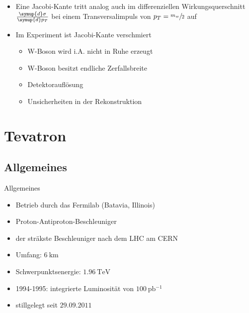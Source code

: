 \documentclass[aspectratio=1610, 9pt]{beamer}
\begin{document}
\begin{frame}
  \begin{itemize}
    \item Eine Jacobi-Kante tritt analog auch im differenziellen Wirkungsquerschnitt $\frac{\symup{d} \sigma}{\symup{d} p_T}$ bei einem Transversalimpuls von $p_T = \sfrac{m_w}{2}$ auf
    \item Im Experiment ist Jacobi-Kante verschmiert
    \begin{itemize}
      \item[\rightarrow] W-Boson wird i.A. nicht in Ruhe erzeugt
      \item[\rightarrow] W-Boson besitzt endliche Zerfallsbreite
      \item[\rightarrow] Detektorauflösung
      \item[\rightarrow] Unsicherheiten in der Rekonstruktion
    \end{itemize}
  \end{itemize}
\end{frame}

\section{Tevatron}

\subsection{Allgemeines}

\begin{frame}{Allgemeines}
    \begin{itemize}
      \item Betrieb durch das Fermilab (Batavia, Illinois)
      \item Proton-Antiproton-Beschleuniger
      \item der sträkste Beschleuniger nach dem LHC am CERN
      \item Umfang: $\SI{6}{\km}$
      \item Schwerpunktsenergie: $\SI{1,96}{\TeV}$
      \item 1994-1995: integrierte Luminosität von $\SI{100}{\pico \barn ^{-1}}$
      \item stillgelegt seit $29.09.2011$
    \end{itemize}
\end{frame}

\end{document}
